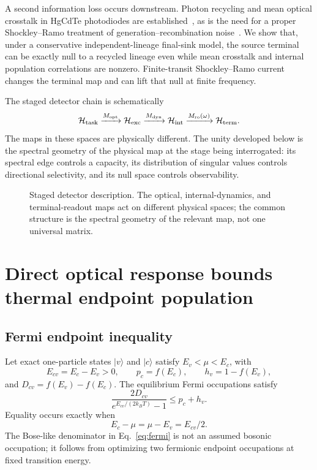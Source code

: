 \documentclass[aps,twocolumn,superscriptaddress,longbibliography]{revtex4-2}
\begin{document}
A second information loss occurs downstream. Photon recycling and mean optical crosstalk in HgCdTe photodiodes are established~\cite{Jozwikowski2011,Jozwikowski2012,Jozwikowska2019,Kopytko2019}, as is the need for a proper Shockley--Ramo treatment of generation--recombination noise~\cite{Dabrowski1987,Dabrowski1989}. We show that, under a conservative independent-lineage final-sink model, the source terminal can be exactly null to a recycled lineage even while mean crosstalk and internal population correlations are nonzero. Finite-transit Shockley--Ramo current changes the terminal map and can lift that null at finite frequency.

The staged detector chain is schematically
\begin{equation}
\mathcal H_{\rm task}\xrightarrow{M_{\rm opt}}\mathcal H_{\rm exc}
\xrightarrow{M_{\rm dyn}}\mathcal H_{\rm int}
\xrightarrow{M_{\rm ro}(\omega)}\mathcal H_{\rm term}.
\label{eq:stages}
\end{equation}
The maps in these spaces are physically different. The unity developed below is the spectral geometry of the physical map at the stage being interrogated: its spectral edge controls a capacity, its distribution of singular values controls directional selectivity, and its null space controls observability.

\begin{figure}[t]
\centering
{}
\caption{Staged detector description. The optical, internal-dynamics, and terminal-readout maps act on different physical spaces; the common structure is the spectral geometry of the relevant map, not one universal matrix.}
\label{fig:stages}
\end{figure}

\section{Direct optical response bounds thermal endpoint population}

\subsection{Fermi endpoint inequality}

Let exact one-particle states $|v\rangle$ and $|c\rangle$ satisfy $E_v<\mu<E_c$, with
\begin{equation}
E_{cv}=E_c-E_v>0,
\qquad p_c=f(E_c),\qquad h_v=1-f(E_v),
\end{equation}
and $D_{cv}=f(E_v)-f(E_c)$. The equilibrium Fermi occupations satisfy
\begin{equation}
\boxed{
\frac{2D_{cv}}{e^{E_{cv}/(2k_BT)}-1}\le p_c+h_v .}
\label{eq:fermi}
\end{equation}
Equality occurs exactly when
\begin{equation}
E_c-\mu=\mu-E_v=E_{cv}/2.
\label{eq:fermi-equality}
\end{equation}
The Bose-like denominator in Eq.~\eqref{eq:fermi} is not an assumed bosonic occupation; it follows from optimizing two fermionic endpoint occupations at fixed transition energy.
\end{document}
